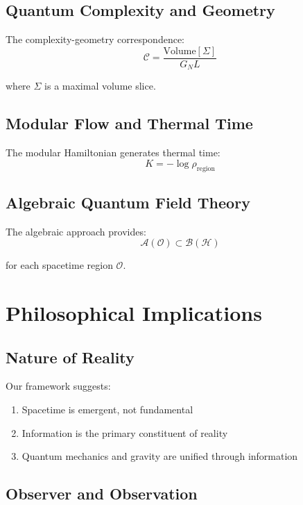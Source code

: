 \documentclass[12pt,a4paper]{article}
\begin{document}
\subsection{Quantum Complexity and Geometry}

The complexity-geometry correspondence:
\begin{equation}
\mathcal{C} = \frac{\text{Volume}[\Sigma]}{G_N L}
\end{equation}

where $\Sigma$ is a maximal volume slice.

\subsection{Modular Flow and Thermal Time}

The modular Hamiltonian generates thermal time:
\begin{equation}
K = -\log \rho_{\text{region}}
\end{equation}

\subsection{Algebraic Quantum Field Theory}

The algebraic approach provides:
\begin{equation}
\mathcal{A}(\mathcal{O}) \subset \mathcal{B}(\mathcal{H})
\end{equation}

for each spacetime region $\mathcal{O}$.

\section{Philosophical Implications}

\subsection{Nature of Reality}

Our framework suggests:
\begin{enumerate}
\item Spacetime is emergent, not fundamental
\item Information is the primary constituent of reality
\item Quantum mechanics and gravity are unified through information
\end{enumerate}

\subsection{Observer and Observation}
\end{document}

